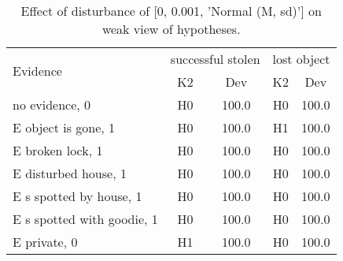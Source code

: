 \begin{table}\begin{tabular}{l|cc|cc}\toprule\multirow{2}{*}{Evidence} & \multicolumn{2}{c}{successful stolen}& \multicolumn{2}{c}{lost object}\\& {K2} & {Dev}& {K2} & {Dev}\\\midrule
no evidence, 0 & H0&100.0&H0&100.0\\E object is gone, 1 & H0&100.0&H1&100.0\\E broken lock, 1 & H0&100.0&H0&100.0\\E disturbed house, 1 & H0&100.0&H0&100.0\\E s spotted by house, 1 & H0&100.0&H0&100.0\\E s spotted with goodie, 1 & H0&100.0&H0&100.0\\E private, 0 & H1&100.0&H0&100.0\\\bottomrule\end{tabular}\caption{Effect of disturbance of [0, 0.001, 'Normal (M, sd)'] on weak view of hypotheses.}\end{table}